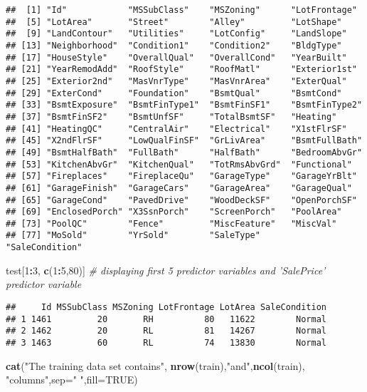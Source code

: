 \documentclass[]{article}
\newenvironment{Shaded}{\begin{snugshade}}{\end{snugshade}}
\newcommand{\KeywordTok}[1]{\textcolor[rgb]{0.13,0.29,0.53}{\textbf{#1}}}
\newcommand{\DataTypeTok}[1]{\textcolor[rgb]{0.13,0.29,0.53}{#1}}
\newcommand{\DecValTok}[1]{\textcolor[rgb]{0.00,0.00,0.81}{#1}}
\newcommand{\StringTok}[1]{\textcolor[rgb]{0.31,0.60,0.02}{#1}}
\newcommand{\CommentTok}[1]{\textcolor[rgb]{0.56,0.35,0.01}{\textit{#1}}}
\newcommand{\OtherTok}[1]{\textcolor[rgb]{0.56,0.35,0.01}{#1}}
\newcommand{\OperatorTok}[1]{\textcolor[rgb]{0.81,0.36,0.00}{\textbf{#1}}}
\newcommand{\NormalTok}[1]{#1}
\begin{document}
\begin{verbatim}
##  [1] "Id"            "MSSubClass"    "MSZoning"      "LotFrontage"  
##  [5] "LotArea"       "Street"        "Alley"         "LotShape"     
##  [9] "LandContour"   "Utilities"     "LotConfig"     "LandSlope"    
## [13] "Neighborhood"  "Condition1"    "Condition2"    "BldgType"     
## [17] "HouseStyle"    "OverallQual"   "OverallCond"   "YearBuilt"    
## [21] "YearRemodAdd"  "RoofStyle"     "RoofMatl"      "Exterior1st"  
## [25] "Exterior2nd"   "MasVnrType"    "MasVnrArea"    "ExterQual"    
## [29] "ExterCond"     "Foundation"    "BsmtQual"      "BsmtCond"     
## [33] "BsmtExposure"  "BsmtFinType1"  "BsmtFinSF1"    "BsmtFinType2" 
## [37] "BsmtFinSF2"    "BsmtUnfSF"     "TotalBsmtSF"   "Heating"      
## [41] "HeatingQC"     "CentralAir"    "Electrical"    "X1stFlrSF"    
## [45] "X2ndFlrSF"     "LowQualFinSF"  "GrLivArea"     "BsmtFullBath" 
## [49] "BsmtHalfBath"  "FullBath"      "HalfBath"      "BedroomAbvGr" 
## [53] "KitchenAbvGr"  "KitchenQual"   "TotRmsAbvGrd"  "Functional"   
## [57] "Fireplaces"    "FireplaceQu"   "GarageType"    "GarageYrBlt"  
## [61] "GarageFinish"  "GarageCars"    "GarageArea"    "GarageQual"   
## [65] "GarageCond"    "PavedDrive"    "WoodDeckSF"    "OpenPorchSF"  
## [69] "EnclosedPorch" "X3SsnPorch"    "ScreenPorch"   "PoolArea"     
## [73] "PoolQC"        "Fence"         "MiscFeature"   "MiscVal"      
## [77] "MoSold"        "YrSold"        "SaleType"      "SaleCondition"
\end{verbatim}

\begin{Shaded}
\begin{Highlighting}[]
\NormalTok{test[}\DecValTok{1}\OperatorTok{:}\DecValTok{3}\NormalTok{, }\KeywordTok{c}\NormalTok{(}\DecValTok{1}\OperatorTok{:}\DecValTok{5}\NormalTok{,}\DecValTok{80}\NormalTok{)]  }\CommentTok{# displaying first 5 predictor variables and 'SalePrice' predictor variable}
\end{Highlighting}
\end{Shaded}

\begin{verbatim}
##     Id MSSubClass MSZoning LotFrontage LotArea SaleCondition
## 1 1461         20       RH          80   11622        Normal
## 2 1462         20       RL          81   14267        Normal
## 3 1463         60       RL          74   13830        Normal
\end{verbatim}

\begin{Shaded}
\begin{Highlighting}[]
\KeywordTok{cat}\NormalTok{(}\StringTok{"The training data set contains"}\NormalTok{, }\KeywordTok{nrow}\NormalTok{(train),}\StringTok{"and"}\NormalTok{,}\KeywordTok{ncol}\NormalTok{(train), }\StringTok{"columns"}\NormalTok{,}\DataTypeTok{sep=}\StringTok{" "}\NormalTok{,}\DataTypeTok{fill=}\OtherTok{TRUE}\NormalTok{)}
\end{Highlighting}
\end{Shaded}
\end{document}
